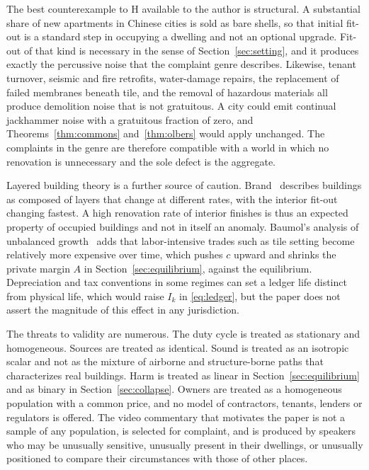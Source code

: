 \documentclass[11pt]{article}
\theoremstyle{definition}
\theoremstyle{remark}
\begin{document}
The best counterexample to H available to the author is structural. A substantial share of new apartments in Chinese cities is sold as bare shells, so that initial fit-out is a standard step in occupying a dwelling and not an optional upgrade. Fit-out of that kind is necessary in the sense of Section~\ref{sec:setting}, and it produces exactly the percussive noise that the complaint genre describes. Likewise, tenant turnover, seismic and fire retrofits, water-damage repairs, the replacement of failed membranes beneath tile, and the removal of hazardous materials all produce demolition noise that is not gratuitous. A city could emit continual jackhammer noise with a gratuitous fraction of zero, and Theorems~\ref{thm:commons} and~\ref{thm:olbers} would apply unchanged. The complaints in the genre are therefore compatible with a world in which no renovation is unnecessary and the sole defect is the aggregate.

Layered building theory is a further source of caution. Brand~\cite{brand} describes buildings as composed of layers that change at different rates, with the interior fit-out changing fastest. A high renovation rate of interior finishes is thus an expected property of occupied buildings and not in itself an anomaly. Baumol's analysis of unbalanced growth~\cite{baumol} adds that labor-intensive trades such as tile setting become relatively more expensive over time, which pushes $c$ upward and shrinks the private margin $A$ in Section~\ref{sec:equilibrium}, against the equilibrium. Depreciation and tax conventions in some regimes can set a ledger life distinct from physical life, which would raise $I_k$ in \eqref{eq:ledger}, but the paper does not assert the magnitude of this effect in any jurisdiction.

The threats to validity are numerous. The duty cycle is treated as stationary and homogeneous. Sources are treated as identical. Sound is treated as an isotropic scalar and not as the mixture of airborne and structure-borne paths that characterizes real buildings. Harm is treated as linear in Section~\ref{sec:equilibrium} and as binary in Section~\ref{sec:collapse}. Owners are treated as a homogeneous population with a common price, and no model of contractors, tenants, lenders or regulators is offered. The video commentary that motivates the paper is not a sample of any population, is selected for complaint, and is produced by speakers who may be unusually sensitive, unusually present in their dwellings, or unusually positioned to compare their circumstances with those of other places.
\end{document}

